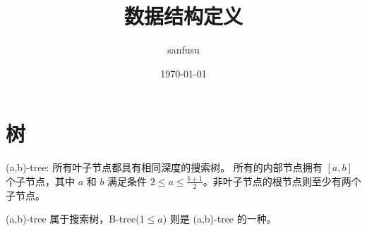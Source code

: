 \documentclass[UTF8]{ctexart}
\begin{document}
    \title{数据结构定义}
    \author{sanfusu}
    \date{\today}
    \maketitle
\section{树}

\begin{Definition}
    (a,b)-tree:
    所有叶子节点都具有相同深度的搜索树。
    所有的内部节点拥有 $[a,b]$ 个子节点，其中 $a$ 和 $b$ 满足条件
    $2\le a \le \frac{b+1}{2}$。非叶子节点的根节点则至少有两个子节点。
\end{Definition}
\begin{Remark}
    (a,b)-tree 属于搜索树，B-tree($1 \le a$) 则是 (a,b)-tree 的一种。
\end{Remark}
\end{document}
